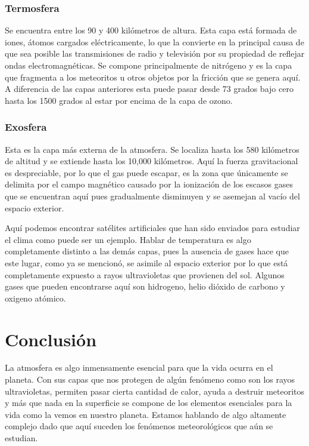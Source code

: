\documentclass[a4paper,12pt]{report}
\begin{document}
\subsection{Termosfera}

Se encuentra entre los 90 y 400 kilómetros de altura. Esta capa está formada de iones, átomos cargados eléctricamente, lo que la convierte en la principal causa de que sea posible las transmisiones de radio y televisión por su propiedad de reflejar ondas electromagnéticas. Se compone principalmente de nitrógeno y es la capa que fragmenta a los meteoritos u otros objetos por la fricción que se genera aquí. A diferencia de las capas anteriores esta puede pasar desde 73 grados bajo cero hasta los 1500 grados al estar por encima de la capa de ozono. 

\subsection{Exosfera}
Esta es la capa más externa de la atmosfera. Se localiza hasta los 580 kilómetros de altitud y se extiende hasta los 10,000 kilómetros. Aquí la fuerza gravitacional es despreciable, por lo que el gas puede escapar, es la zona que únicamente se delimita por el campo magnético causado por la ionización de los escasos gases que se encuentran aquí pues gradualmente disminuyen y se asemejan al vacío del espacio exterior.

Aquí podemos encontrar satélites artificiales que han sido enviados para estudiar el clima como puede ser un ejemplo. Hablar de temperatura es algo completamente distinto a las demás capas, pues la ausencia de gases hace que este lugar, como ya se mencionó, se asimile al espacio exterior por lo que está completamente expuesto a rayos ultravioletas que provienen del sol. Algunos gases que pueden encontrarse aquí son hidrogeno, helio dióxido de carbono y oxigeno atómico.


\newpage

\chapter{Conclusión}
La atmosfera es algo inmensamente esencial para que la vida ocurra en el planeta. Con sus capas que nos protegen de algún fenómeno como son los rayos ultravioletas, permiten pasar cierta cantidad de calor, ayuda a destruir meteoritos y más que nada en la superficie se compone de los elementos esenciales para la vida como la vemos en nuestro planeta. Estamos hablando de algo altamente complejo dado que aquí suceden los fenómenos meteorológicos que aún se estudian.
\end{document}
